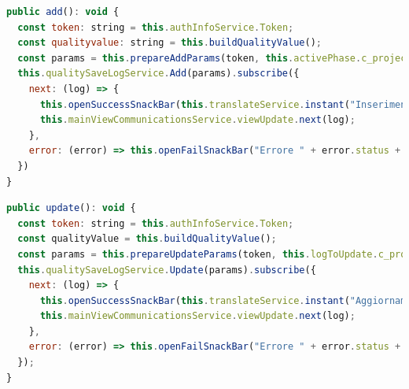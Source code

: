\begin{lstlisting}[language=JavaScript, caption={Aggiunta di dati di controllo qualità}]
public add(): void {
  const token: string = this.authInfoService.Token;
  const qualityvalue: string = this.buildQualityValue();
  const params = this.prepareAddParams(token, this.activePhase.c_projectphase_id!, qualityvalue)
  this.qualitySaveLogService.Add(params).subscribe({
    next: (log) => {
      this.openSuccessSnackBar(this.translateService.instant("Inserimento avvenuto correttamente!"), "X");
      this.mainViewCommunicationsService.viewUpdate.next(log);
    },
    error: (error) => this.openFailSnackBar("Errore " + error.status + " - " + error.error.description, "X")
  })
}
\end{lstlisting}

\begin{lstlisting}[language=JavaScript, caption={Modifica di dati di controllo qualità}]
public update(): void {
  const token: string = this.authInfoService.Token;
  const qualityValue = this.buildQualityValue();
  const params = this.prepareUpdateParams(token, this.logToUpdate.c_projectphase_quality_log_id!, qualityValue);
  this.qualitySaveLogService.Update(params).subscribe({
    next: (log) => {
      this.openSuccessSnackBar(this.translateService.instant("Aggiornamento avvenuto correttamente!"), "X")
      this.mainViewCommunicationsService.viewUpdate.next(log);
    },
    error: (error) => this.openFailSnackBar("Errore " + error.status + " - " + error.error.description, "X")
  });
}
\end{lstlisting}




